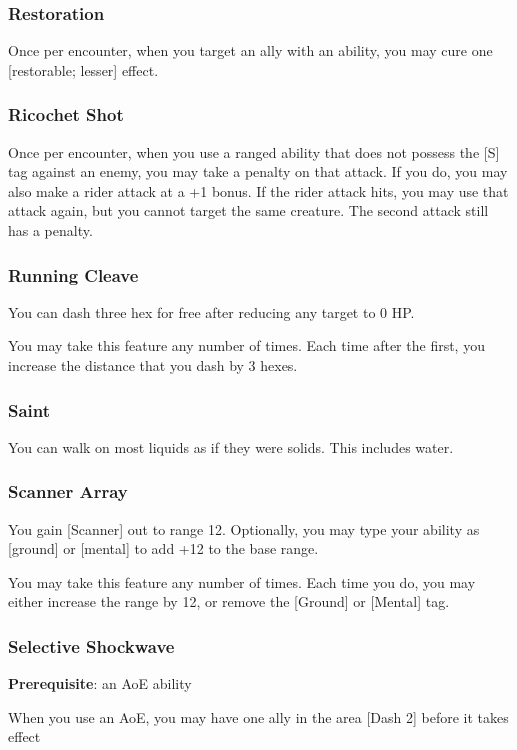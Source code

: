 \begin{multicols*}{2}
\subsubsection{Restoration}
Once per encounter, when you target an ally with an ability, you may cure one [restorable; lesser] effect.

\subsubsection{Ricochet Shot}
Once per encounter, when you use a ranged ability that does not possess the [S] tag against an enemy, you may take a penalty on that attack. If you do, you may also make a rider attack at a +1 bonus. If the rider attack hits, you may use that attack again, but you cannot target the same creature. The second attack still has a penalty.

\subsubsection{Running Cleave}
You can dash three hex for free after reducing any target to 0 HP.

You may take this feature any number of times. Each time after the first, you increase the distance that you dash by 3 hexes.

\subsubsection{Saint}
You can walk on most liquids as if they were solids. This includes water.

\subsubsection{Scanner Array}
You gain [Scanner] out to range 12. Optionally, you may type your ability as [ground] or [mental] to add +12 to the base range.

You may take this feature any number of times. Each time you do, you may either increase the range by 12, or remove the [Ground] or [Mental] tag.

\subsubsection{Selective Shockwave \R }
\textbf{Prerequisite}: an AoE ability

When you use an AoE, you may have one ally in the area [Dash 2] before it takes effect


\end{multicols*}
